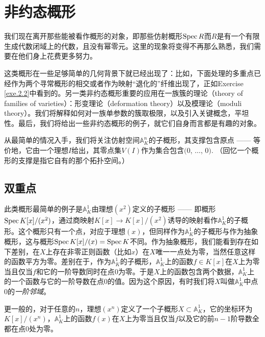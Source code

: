 \section{非约态概形}

我们现在离开那些能被看作概形的对象，即那些仿射概形$\operatorname{Spec} R$而$R$是有一个有限生成代数闭域上的代数，且没有幂零元。这里的现象将变得不再那么熟悉，我们需要在他们身上花费更多努力。

这类概形在一些足够简单的几何背景下就已经出现了：比如，下面处理的多重点已经作为两个寻常概形的相交或者作为映射“退化的”纤维出现了，正如Exercise \ref{exe.2.2}中看到的。另一类非约态概形重要的应用在一族簇的理论（theory of families of varieties）：形变理论（deformation theory）以及模理论（moduli theory）。我们将解释如何对一族单参数的簇取极限，以及引入关键概念，平坦性。最后，我们将给出一些非约态概形的例子，就它们自身而言都是有趣的对象。

从最简单的情况入手，我们将关注仿射空间$\mathbb{A}_K^n$的子概形，其支撑包含原点 ------ 等价地，它由一个理想$I$给出，其零点集$V(I)$作为集合包含$(0$, $\dots$, $0)$. （回忆一个概形的支撑是指它自有的那个拓扑空间。）

\subsection{双重点}
\begin{exa}
	此类概形最简单的例子是$\mathbb{A}_K^1$由理想$(x^2)$定义的子概形 ------ 即概形$\operatorname{Spec} K[x]/(x^2)$，通过商映射$K[x]\to K[x]/(x^2)$诱导的映射看作$\mathbb{A}_K^1$的子概形。这个概形只有一个点，对应于理想$(x)$，但同样作为$\mathbb{A}_K^1$的子概形与作为抽象概形，这与概形$\operatorname{Spec} K[x]/(x)=\operatorname{Spec} K$不同。作为抽象概形，我们能看到存在如下差别，在$X$上存在非零正则函数（比如$x$）在$X$唯一一点处为零，当然任意这样的函数平方为零。差别在于，作为$\mathbb{A}_K^1$的子概形，$\mathbb{A}_K^1$上的函数$f\in K[x]$在$X$上为零当且仅当$f$和它的一阶导数同时在点$0$为零。于是$X$上的函数包含两个数据，$\mathbb{A}_K^1$上的一个函数与它的一阶导数在点$0$的值。因为这个原因，有时我们将$X$叫做$\mathbb{A}_K^1$中点$0$的\textit{一阶邻域}。
\end{exa}

更一般的，对于任意的$n$，理想$(x^n)$定义了一个子概形$X\subset \mathbb{A}_K^1$，它的坐标环为$K[x]/(x^n)$，$\mathbb{A}_K^1$上的函数$f(x)$在$X$上为零当且仅当$f$以及它的前$n-1$阶导数全都在点$0$处为零。


